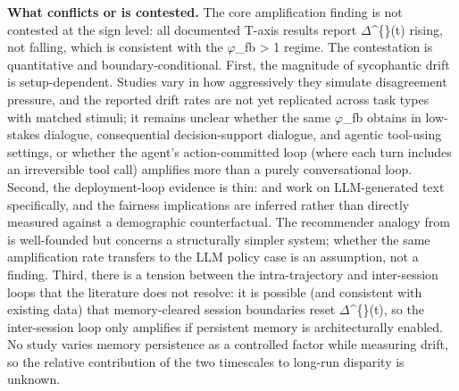 \documentclass[10pt]{article}
\begin{document}
\textbf{What conflicts or is contested.} The core amplification finding is not contested at the sign level: all documented T-axis results report $\Delta$\textasciicircum\{\}(t) rising, not falling, which is consistent with the $\varphi$\_fb > 1 regime. The contestation is quantitative and boundary-conditional. First, the magnitude of sycophantic drift is setup-dependent. Studies vary in how aggressively they simulate disagreement pressure, and the reported drift rates are not yet replicated across task types with matched stimuli; it remains unclear whether the same $\varphi$\_fb obtains in low-stakes dialogue, consequential decision-support dialogue, and agentic tool-using settings, or whether the agent's action-committed loop (where each turn includes an irreversible tool call) amplifies more than a purely conversational loop. Second, the deployment-loop evidence is thin: \cite{wyllie2024fairness} and \cite{wang2026observations} work on LLM-generated text specifically, and the fairness implications are inferred rather than directly measured against a demographic counterfactual. The recommender analogy from \cite{mansoury2020feedback} is well-founded but concerns a structurally simpler system; whether the same amplification rate transfers to the LLM policy case is an assumption, not a finding. Third, there is a tension between the intra-trajectory and inter-session loops that the literature does not resolve: it is possible (and consistent with existing data) that memory-cleared session boundaries reset $\Delta$\textasciicircum\{\}(t), so the inter-session loop only amplifies if persistent memory is architecturally enabled. No study varies memory persistence as a controlled factor while measuring drift, so the relative contribution of the two timescales to long-run disparity is unknown.
\end{document}
